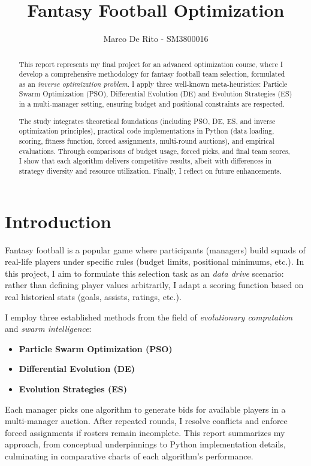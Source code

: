 \documentclass[sigconf]{acmart}
\title{Fantasy Football Optimization}
\author{Marco De Rito - SM3800016}
\affiliation{
	\institution{University of Trieste}
	\city{Trieste}
	\country{Italy}
}
\begin{document}
	\sloppy
	\begin{abstract}
		This report represents my final project for an advanced optimization course, where I develop a comprehensive methodology for fantasy football team selection, formulated as an \emph{inverse optimization problem}. I apply three well-known meta-heuristics: Particle Swarm Optimization (PSO), Differential Evolution (DE) and Evolution Strategies (ES) in a multi-manager setting, ensuring budget and positional constraints are respected.
		
		The study integrates theoretical foundations (including PSO, DE, ES, and inverse optimization principles), practical code implementations in Python (data loading, scoring, fitness function, forced assignments, multi-round auctions), and empirical evaluations. Through comparisons of budget usage, forced picks, and final team scores, I show that each algorithm delivers competitive results, albeit with differences in strategy diversity and resource utilization. Finally, I reflect on future enhancements.
	\end{abstract}
	
	
	\maketitle
	
	\section{Introduction}
	Fantasy football is a popular game where participants (managers) build squads of real-life players under specific rules (budget limits, positional minimums, etc.). In this project, I aim to formulate this selection task as an \emph{data drive} scenario: rather than defining player values arbitrarily, I adapt a scoring function based on real historical stats (goals, assists, ratings, etc.).
	
	I employ three established methods from the field of \emph{evolutionary computation} and \emph{swarm intelligence}:
	\begin{itemize}
		\item \textbf{Particle Swarm Optimization (PSO)}
		\item \textbf{Differential Evolution (DE)}
		\item \textbf{Evolution Strategies (ES)}
	\end{itemize}
	Each manager picks one algorithm to generate bids for available players in a multi-manager auction. After repeated rounds, I resolve conflicts and enforce forced assignments if rosters remain incomplete. This report summarizes my approach, from conceptual underpinnings to Python implementation details, culminating in comparative charts of each algorithm’s performance.
	
\end{document}
